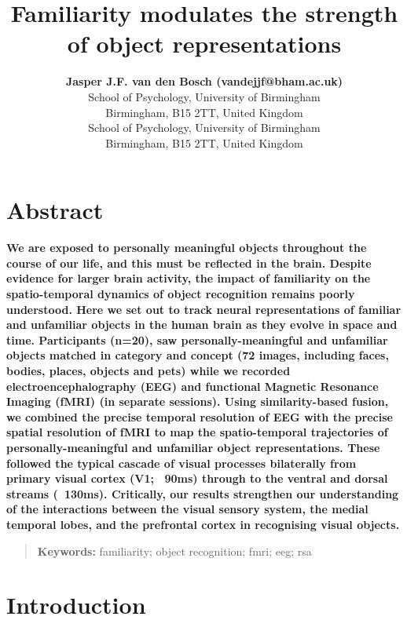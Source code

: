 \documentclass[10pt,letterpaper]{article}
\title{Familiarity modulates the strength of object representations}
\author{{\large \bf Jasper J.F. van den Bosch (vandejjf@bham.ac.uk)} \\
  School of Psychology, University of Birmingham\\
  Birmingham, B15 2TT, United Kingdom
  \AND {\large \bf Ian Charest (charesti@bham.ac.uk)} \\
  School of Psychology, University of Birmingham\\
  Birmingham, B15 2TT, United Kingdom}
\begin{document}
\maketitle


\section{Abstract}
{
\bf
We are exposed to personally meaningful objects throughout the 
course of our life, and this must  be reflected in the brain. 
Despite evidence for larger brain activity, the impact of 
familiarity on the spatio-temporal dynamics of object recognition 
remains poorly understood. Here we set out to track neural 
representations of familiar and unfamiliar objects in the human 
brain as they evolve in space and time. Participants (n=20), 
saw personally-meaningful and unfamiliar objects matched in 
category and concept (72 images, including faces, bodies, 
places, objects and pets) while we recorded electroencephalography 
(EEG) and functional Magnetic Resonance Imaging (fMRI) (in separate 
sessions). Using similarity-based fusion, we combined the precise 
temporal resolution of EEG with the precise spatial resolution of 
fMRI to map the spatio-temporal trajectories of personally-meaningful 
and unfamiliar object representations. These followed the typical 
cascade of visual processes bilaterally from primary visual cortex 
(V1; ~90ms) through to the ventral and dorsal streams (~130ms). 
Critically, our results strengthen our understanding of the interactions 
between the visual sensory system, the medial temporal lobes, and 
the prefrontal cortex in recognising visual objects. 
}
\begin{quote}
\small
\textbf{Keywords:} 
familiarity; object recognition; fmri; eeg; rsa
\end{quote}

\section{Introduction}
\end{document}
